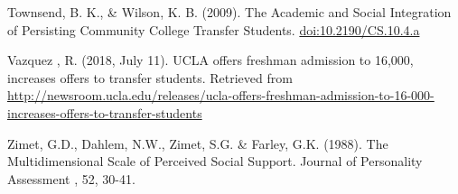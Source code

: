 \documentclass[]{book}
\begin{document}
Townsend, B. K., \& Wilson, K. B. (2009). The Academic and Social Integration of Persisting
Community College Transfer Students. \url{doi:10.2190/CS.10.4.a}

Vazquez , R. (2018, July 11). UCLA offers freshman admission to 16,000, increases offers to
transfer students. Retrieved from
\url{http://newsroom.ucla.edu/releases/ucla-offers-freshman-admission-to-16-000-increases-offers-to-transfer-students}

Zimet, G.D., Dahlem, N.W., Zimet, S.G. \& Farley, G.K. (1988). The Multidimensional Scale of
Perceived Social Support. Journal of Personality Assessment , 52, 30-41.


\end{document}
